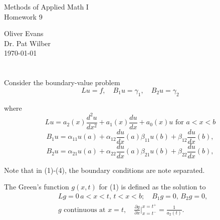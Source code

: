 \documentclass[10pt]{article}
\begin{document}
\null

\thispagestyle{empty}
\addtocounter{page}{-1}

\begin{center}
    \begin{sffamily}
	\begin{bfseries}
	    \null
	    \vfill
	    \Huge{Methods of Applied Math I} \\

	    \vspace{10pt}
		\huge{Homework 9} \\
	    \vspace{20pt}
    \begin{LARGE}
		Oliver Evans \\
		Dr. Pat Wilber \\[.5em]
	\vspace{20pt}
	\today
    \end{LARGE}
	\end{bfseries}
    \end{sffamily}
    \vspace{30pt}

    \null
    \vfill
    \vfill
    \null
\end{center}
\pagebreak

\section{}
Consider the boundary-value problem
\begin{equation}
	Lu = f, \quad B_1u = \gamma_1, \quad B_2u = \gamma_2
\end{equation}

where
\begin{equation}
	Lu = a_2(x)\frac{d^2u}{dx^2} + a_1(x)\frac{du}{dx} + a_0(x) u \mbox{ for } a<x<b
\end{equation}
\begin{equation}
	B_1u = \alpha_{11}u(a) + \alpha_{12}\frac{du}{dx}(a) \beta_{11}u(b) + \beta_{12}\frac{du}{dx}(b),
\end{equation}
\begin{equation}
	B_2u = \alpha_{21}u(a) + \alpha_{22}\frac{du}{dx}(a) \beta_{21}u(b) + \beta_{22}\frac{du}{dx}(b),
\end{equation}

Note that in (1)-(4), the boundary conditions are note separated.

The Green's function $g(x,t)$ for (1) is defined as the solution to
\begin{equation}
	\begin{split}
		&Lg = 0\, a<x<t, \, t<x<b; \quad B_1g = 0, \, B_2g = 0, \\
		&g \mbox{ continuous at } x=t, \quad \frac{\partial g}{\partial x}\Big|_{x=t^-}^{x=t^+} = \frac{1}{a_2(t)}.
	\end{split}
\end{equation}
\end{document}
